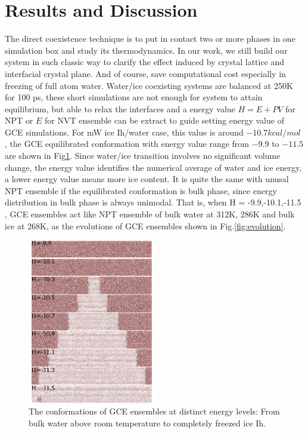 \documentclass[aps,prl,twocolumn,superscriptaddress]{revtex4-1}
\begin{document}
\section{Results and Discussion} 
The direct coexistence technique is to put in contact two or more phases in one simulation box and study its thermodynamics. In our work, we still build our system in such classic way to clarify the effect induced by crystal lattice and interfacial crystal plane. And of course, save computational cost especially in freezing of full atom water. Water/ice coexisting systems are balanced at 250K for 100 ps, these short simulations are not enough for system to attain equilibrium, but able to relax the interfaces and a energy value $H=E+PV$ for NPT or $E$ for NVT ensemble can be extract to guide setting  energy value of GCE simulations\cite{Xu2012,Xu2015}. For mW ice Ih/water case, this value is around $-10.7 kcal/mol$  ,  the GCE equilibrated conformation with energy value range from $-9.9$ to $-11.5$ are shown in Fig\ref{fig:conformation}. Since water/ice transition involves no significant volume change, the energy value identifies the numerical average of water and ice energy, a lower energy value means more ice content. It is quite the same with unusal NPT ensemble if the equilibrated conformation is bulk phase, since energy distribution in bulk phase is always unimodal. That is, when H = -9.9,-10.1,-11.5 , GCE ensembles act like NPT ensemble of bulk water at 312K, 286K and bulk ice at 268K, as the evolutions of GCE ensembles  shown in Fig.\ref{fig:evolution}.
\begin{figure}[ht]
\centering{}\includegraphics[width=0.5\textwidth]{conf.png} 
\caption{The conformations of GCE ensembles at distinct energy levels: From bulk water above room temperature to completely freezed ice Ih.
\label{fig:conformation} }
\end{figure}
\end{document}

